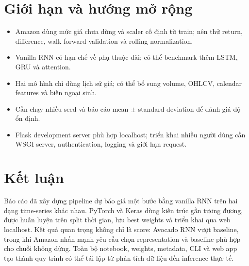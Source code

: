 \documentclass[12pt,a4paper]{report}
\begin{document}
\section{Giới hạn và hướng mở rộng}
\begin{itemize}
    \item Amazon dùng mức giá chưa dừng và scaler cố định từ train; nên thử return, difference,
          walk-forward validation và rolling normalization.
    \item Vanilla RNN có hạn chế về phụ thuộc dài; có thể benchmark thêm LSTM, GRU và attention.
    \item Hai mô hình chỉ dùng lịch sử giá; có thể bổ sung volume, OHLCV, calendar features và biến ngoại sinh.
    \item Cần chạy nhiều seed và báo cáo mean $\pm$ standard deviation để đánh giá độ ổn định.
    \item Flask development server phù hợp localhost; triển khai nhiều người dùng cần WSGI server,
          authentication, logging và giới hạn request.
\end{itemize}

\section{Kết luận}
Báo cáo đã xây dựng pipeline dự báo giá một bước bằng vanilla RNN trên hai dạng time-series khác nhau.
PyTorch và Keras dùng kiến trúc gần tương đương, được huấn luyện trên split thời gian, lưu best weights
và triển khai qua web localhost. Kết quả quan trọng không chỉ là score: Avocado RNN vượt baseline,
trong khi Amazon nhấn mạnh yêu cầu chọn representation và baseline phù hợp cho chuỗi không dừng.
Toàn bộ notebook, weights, metadata, CLI và web app tạo thành quy trình có thể tái lập từ phân tích dữ
liệu đến inference thực tế.
\end{document}
